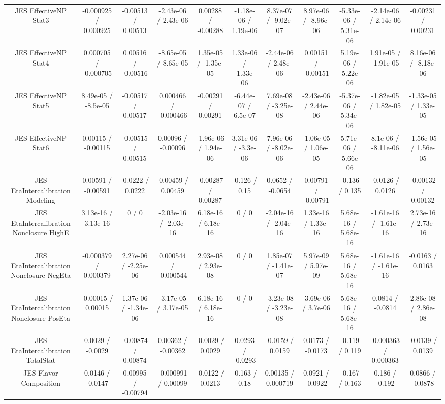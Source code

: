 \begin{table}[htbp]
\begin{center}
\begin{tabular}{|c|c|c|c|c|c|c|c|c|c|c|}
  JES EffectiveNP Stat3 & -0.000925 / 0.000925 & -0.00513 / 0.00513 & -2.43e-06 / 2.43e-06 & 0.00288 / -0.00288 & -1.18e-06 / 1.19e-06 & 8.37e-07 / -9.02e-07 & 8.97e-06 / -8.96e-06 & -5.33e-06 / 5.31e-06 & -2.14e-06 / 2.14e-06 & -0.00231 / 0.00231 \\ 
  JES EffectiveNP Stat4 & 0.000705 / -0.000705 & 0.00516 / -0.00516 & -8.65e-05 / 8.65e-05 & 1.35e-05 / -1.35e-05 & 1.33e-06 / -1.33e-06 & -2.44e-06 / 2.48e-06 & 0.00151 / -0.00151 & 5.19e-06 / -5.22e-06 & 1.91e-05 / -1.91e-05 & 8.16e-06 / -8.18e-06 \\ 
  JES EffectiveNP Stat5 & 8.49e-05 / -8.5e-05 & -0.00517 / 0.00517 & 0.000466 / -0.000466 & -0.00291 / 0.00291 & -6.44e-07 / 6.5e-07 & 7.69e-08 / -3.25e-08 & -2.43e-06 / 2.44e-06 & -5.37e-06 / 5.34e-06 & -1.82e-05 / 1.82e-05 & -1.33e-05 / 1.33e-05 \\ 
  JES EffectiveNP Stat6 & 0.00115 / -0.00115 & -0.00515 / 0.00515 & 0.00096 / -0.00096 & -1.96e-06 / 1.94e-06 & 3.31e-06 / -3.3e-06 & 7.96e-06 / -8.02e-06 & -1.06e-05 / 1.06e-05 & 5.71e-06 / -5.66e-06 & 8.1e-06 / -8.11e-06 & -1.56e-05 / 1.56e-05 \\ 
  JES EtaIntercalibration Modeling & 0.00591 / -0.00591 & -0.0222 / 0.0222 & -0.00459 / 0.00459 & -0.00287 / 0.00287 & -0.126 / 0.15 & 0.0652 / -0.0654 & 0.00791 / -0.00791 & -0.136 / 0.135 & -0.0126 / 0.0126 & -0.00132 / 0.00132 \\ 
  JES EtaIntercalibration Nonclosure HighE & 3.13e-16 / 3.13e-16 & 0 / 0 & -2.03e-16 / -2.03e-16 & 6.18e-16 / 6.18e-16 & 0 / 0 & -2.04e-16 / -2.04e-16 & 1.33e-16 / 1.33e-16 & 5.68e-16 / 5.68e-16 & -1.61e-16 / -1.61e-16 & 2.73e-16 / 2.73e-16 \\ 
  JES EtaIntercalibration Nonclosure NegEta & -0.000379 / 0.000379 & 2.27e-06 / -2.25e-06 & 0.000544 / -0.000544 & 2.93e-08 / 2.93e-08 & 0 / 0 & 1.85e-07 / -1.41e-07 & 5.97e-09 / 5.97e-09 & 5.68e-16 / 5.68e-16 & -1.61e-16 / -1.61e-16 & -0.0163 / 0.0163 \\ 
  JES EtaIntercalibration Nonclosure PosEta & -0.00015 / 0.00015 & 1.37e-06 / -1.34e-06 & -3.17e-05 / 3.17e-05 & 6.18e-16 / 6.18e-16 & 0 / 0 & -3.23e-08 / -3.23e-08 & -3.69e-06 / 3.7e-06 & 5.68e-16 / 5.68e-16 & 0.0814 / -0.0814 & 2.86e-08 / 2.86e-08 \\ 
  JES EtaIntercalibration TotalStat & 0.0029 / -0.0029 & -0.00874 / 0.00874 & 0.00362 / -0.00362 & -0.0029 / 0.0029 & 0.0293 / -0.0293 & -0.0159 / 0.0159 & 0.0173 / -0.0173 & -0.119 / 0.119 & -0.000363 / 0.000363 & -0.0139 / 0.0139 \\ 
  JES Flavor Composition & 0.0146 / -0.0147 & 0.00995 / -0.00794 & -0.000991 / 0.00099 & -0.0122 / 0.0213 & -0.163 / 0.18 & 0.00135 / 0.000719 & 0.0921 / -0.0922 & -0.167 / 0.163 & 0.186 / -0.192 & 0.0866 / -0.0878 \\ 

\end{tabular}
\end{center}
\end{table}
